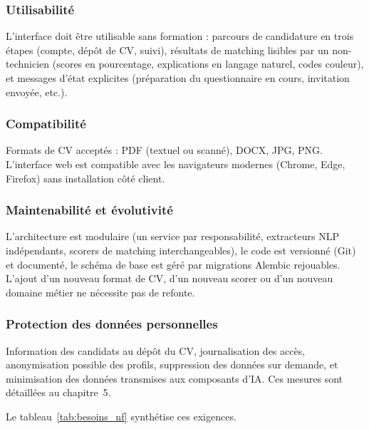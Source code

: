 \documentclass[12pt,a4paper]{report}
\begin{document}
\subsubsection{Utilisabilité}

L'interface doit être utilisable sans formation : parcours de candidature en trois étapes (compte, dépôt de CV, suivi), résultats de matching lisibles par un non-technicien (scores en pourcentage, explications en langage naturel, codes couleur), et messages d'état explicites (préparation du questionnaire en cours, invitation envoyée, etc.).

\subsubsection{Compatibilité}

Formats de CV acceptés : PDF (textuel ou scanné), DOCX, JPG, PNG. L'interface web est compatible avec les navigateurs modernes (Chrome, Edge, Firefox) sans installation côté client.

\subsubsection{Maintenabilité et évolutivité}

L'architecture est modulaire (un service par responsabilité, extracteurs NLP indépendants, scorers de matching interchangeables), le code est versionné (Git) et documenté, le schéma de base est géré par migrations Alembic rejouables. L'ajout d'un nouveau format de CV, d'un nouveau scorer ou d'un nouveau domaine métier ne nécessite pas de refonte.

\subsubsection{Protection des données personnelles}

Information des candidats au dépôt du CV, journalisation des accès, anonymisation possible des profils, suppression des données sur demande, et minimisation des données transmises aux composants d'IA. Ces mesures sont détaillées au chapitre~5.

Le tableau~\ref{tab:besoins_nf} synthétise ces exigences.
\end{document}
